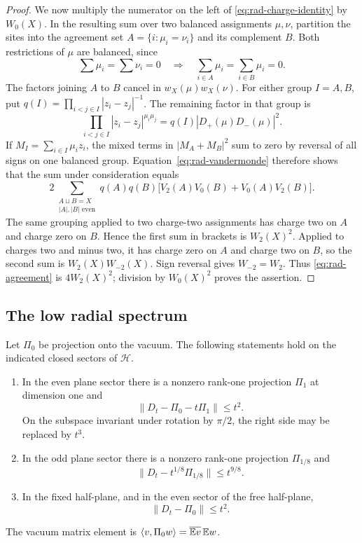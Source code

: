 \begin{proof}
We now multiply the numerator on the left of
\eqref{eq:rad-charge-identity} by $W_0(X)$.  In the resulting sum over
two balanced assignments $\mu,\nu$, partition the sites into the
agreement set $A=\{i:\mu_i=\nu_i\}$ and its complement $B$.
Both restrictions of $\mu$ are balanced, since
\[
 \sum\mu_i=\sum\nu_i=0
 \quad\Longrightarrow\quad
 \sum_{i\in A}\mu_i=\sum_{i\in B}\mu_i=0.
\]
The factors joining $A$ to $B$ cancel in $w_X(\mu)w_X(\nu)$.
For either group $I=A,B$, put
$q(I)=\prod_{i<j\in I}|z_i-z_j|^{-1}$.  The remaining factor in that
group is
\[
 \prod_{i<j\in I}|z_i-z_j|^{\mu_i\mu_j}
                      =q(I)|D_+(\mu)D_-(\mu)|^2.
\]
If $M_I=\sum_{i\in I}\mu_i z_i$, the mixed terms in
$|M_A+M_B|^2$ sum to zero by reversal of all signs on one balanced
group.  Equation~\eqref{eq:rad-vandermonde} therefore shows that the
sum under consideration equals
\begin{equation}
 2\sum_{\substack{A\sqcup B=X\\|A|,|B|\text{ even}}}q(A)q(B)
       \bigl[V_2(A)V_0(B)+V_0(A)V_2(B)\bigr].
 \label{eq:rad-agreement}
\end{equation}
The same grouping applied to two charge-two assignments has charge
two on $A$ and charge zero on $B$.  Hence the first sum in brackets
is $W_2(X)^2$.  Applied to charges two and minus two, it has charge
zero on $A$ and charge two on $B$, so the second sum is
$W_2(X)W_{-2}(X)$.  Sign reversal gives $W_{-2}=W_2$.
Thus \eqref{eq:rad-agreement} is $4W_2(X)^2$; division by
$W_0(X)^2$ proves the assertion.
\end{proof}

\subsection{The low radial spectrum}

\begin{proposition}
\label{rad:spectrum}
Let $\Pi_0$ be projection onto the vacuum.  The following statements
hold on the indicated closed sectors of $\mathcal H$.
\begin{enumerate}[label=\textnormal{(\roman*)}]
\item In the even plane sector there is a nonzero rank-one projection
      $\Pi_1$ at dimension one and
      \[
      \|D_t-\Pi_0-t\Pi_1\|\leq t^2.
      \]
      On the subspace invariant under rotation by $\pi/2$, the right
      side may be replaced by $t^3$.
\item In the odd plane sector there is a nonzero rank-one projection
      $\Pi_{1/8}$ and
      \[
      \|D_t-t^{1/8}\Pi_{1/8}\|\leq t^{9/8}.
      \]
\item In the fixed half-plane, and in the even sector of the free
      half-plane,
      \[
                       \|D_t-\Pi_0\|\leq t^2.
      \]
\end{enumerate}
The vacuum matrix element is
$\langle v,\Pi_0w\rangle
=\overline{\mathbb E v}\,\mathbb E w$.
\end{proposition}

